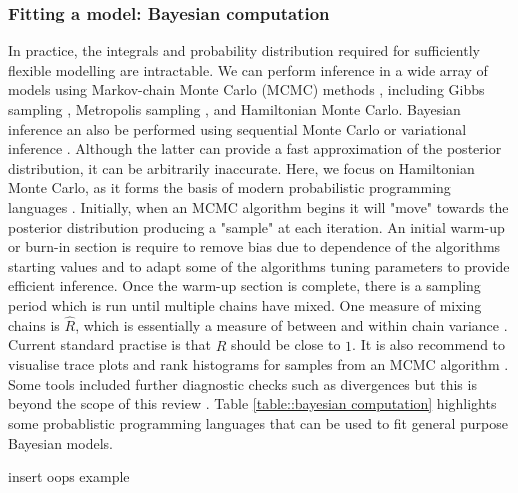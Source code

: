 \documentclass[12pt,english]{article}
\begin{document}
\subsubsection{Fitting a model: Bayesian computation}
In practice, the integrals and probability distribution required for sufficiently flexible modelling are intractable. We can perform inference in a wide array of models using Markov-chain Monte Carlo (MCMC) methods \citep{Gilks::1995, Brooks::2011}, including Gibbs sampling \citep{Smith::1993, Gelfand::2000}, Metropolis sampling \citep{Robert::1999}, and Hamiltonian Monte Carlo\citep{Hoffman::2014}. Bayesian inference an also be performed using sequential Monte Carlo \citep{Del::2006} or variational inference \citep{Blei::2017}. Although the latter can provide a fast approximation of the posterior distribution, it can be arbitrarily inaccurate. Here, we focus on Hamiltonian Monte Carlo, as it forms the basis of modern probabilistic programming languages \citep{Carpenter::2017}. Initially, when an MCMC algorithm begins it will "move" towards the posterior distribution producing a "sample" at each iteration. An initial warm-up or burn-in section is require to remove bias due to dependence of the algorithms starting values and to adapt some of the algorithms tuning parameters to provide efficient inference. Once the warm-up section is complete, there is a sampling period which is run until multiple chains have mixed. One measure of mixing chains is $\hat{R}$, which is essentially a measure of between and within chain variance \citep{Vehtari::2019}. Current standard practise is that $\hat{R}$ should be close to $1$. It is also recommend to visualise trace plots and rank histograms for samples from an MCMC algorithm \citep{Gabry::2019}. Some tools included further diagnostic checks such as divergences but this is beyond the scope of this review \citep{Betancourt::2017}. Table \ref{table::bayesian computation} highlights some probablistic programming languages that can be used to fit general purpose Bayesian models.

insert oops example
\end{document}
